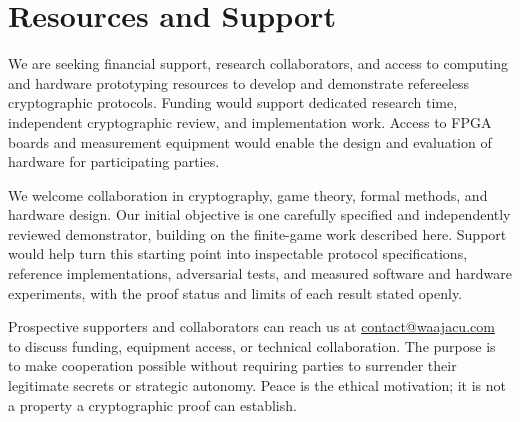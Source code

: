 \documentclass[conference,letterpaper]{IEEEtran}
\begin{document}
\section{Resources and Support}
We are seeking financial support, research collaborators, and access to
computing and hardware prototyping resources to develop and demonstrate
refereeless cryptographic protocols. Funding would support dedicated
research time, independent cryptographic review, and implementation work.
Access to FPGA boards and measurement equipment would enable the design
and evaluation of hardware for participating parties.

We welcome collaboration in cryptography, game theory, formal methods, and
hardware design. Our initial objective is one carefully specified and
independently reviewed demonstrator, building on the finite-game work
described here. Support would help turn this starting point into inspectable
protocol specifications, reference implementations, adversarial tests, and
measured software and hardware experiments, with the proof status and limits
of each result stated openly.

Prospective supporters and collaborators can reach us at
\href{mailto:contact@waajacu.com}{contact@waajacu.com} to discuss funding,
equipment access, or technical collaboration. The purpose is to make
cooperation possible without requiring parties to surrender their legitimate
secrets or strategic autonomy. Peace is the ethical motivation; it is not a
property a cryptographic proof can establish.



\end{document}
